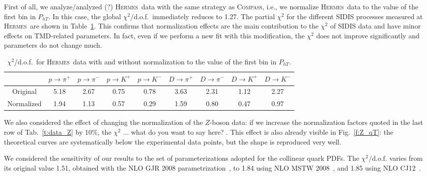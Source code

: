\documentclass[aps,preprintnumbers,showpacs,nofootinbib,superscriptaddress,floatfix]{revtex4}
\newcommand{\AS}[1]{{\textcolor[rgb]{1,0,1}{#1}}}
\newcommand{\hermes}{\textsc{Hermes}}
\newcommand{\compass}{\textsc{Compass}}
\begin{document}
First of all, we \AS{analyze/analyzed (?)} \hermes\ data with the same strategy as \compass,
i.e., we normalize \hermes\ data to the value of the first bin
in $P_{hT}$. In this case, the global
$\chi^2/$d.o.f.~immediately reduces to 1.27. The partial $\chi^2$ for the
different SIDIS processes measured 
at \hermes\ are shown in Table~\ref{t:replica105-hermes}. 
This confirms that normalization effects are the main contribution to the
$\chi^2$ of SIDIS data and have minor effects on TMD-related parameters. In
fact, even if we perform a new fit with this modification, the $\chi^2$ does
not improve significantly and parameters do not change much.


\begin{table}[h!]
\begin{center}
\begin{tabular}{|c|c|c|c|c|c|c|c|c|}
 \hline
\hline
 ~     &  $p \to \pi^+$    &   $p \to \pi^-$    &  $p \to K^+$    &   $p \to K^-$       &  $D \to \pi^+$    &   $D \to \pi^-$    &  $D \to K^+$    &   $D \to K^-$                \\
\hline
 Original   &  5.18 &  2.67 & 0.75  & 0.78      &  3.63 &  2.31 & 1.12  & 2.27    \\
 \hline
Normalized  &  1.94 &  1.13 &  0.57 & 0.29 & 1.59  & 0.80 & 0.47 & 0.97  \\            
 \hline
 \hline
\end{tabular}
\caption{$\chi^2$/d.o.f.\ for \hermes\ data with and without normalization to the value of the first bin in $P_{hT}$.} 
\label{t:replica105-hermes}
\end{center}
\end{table}

We also considered the effect of changing the normalization of the $Z$-boson
data: if we increase the normalization factors quoted
in the last row of Tab.~\ref{t:data_Z} by 10\%, the $\chi^2$ \AS{... what do you want to say here?} . This effect is
also already visible in Fig.~\ref{f:Z_qT}: the theoretical curves are
systematically below the experimental data points, but the shape is reproduced
very well.

We considered the sensitivity of our results to the set of
parameterizations adopted for the collinear quark PDFs. 
The $\chi^2/ \text{d.o.f.}$ varies from its original value
1.51, obtained with the NLO GJR 2008 parametrization~\cite{Gluck:2007ck}, to
1.84 using NLO MSTW 2008~\cite{Martin:2009iq}, and 1.85 using NLO
CJ12~\cite{Owens:2012bv}. 
\end{document}

